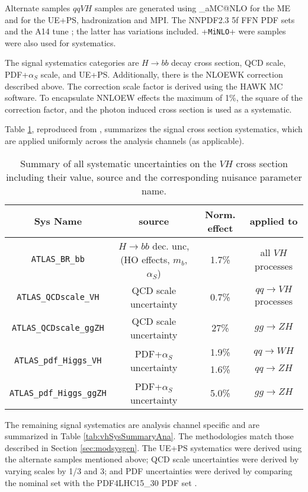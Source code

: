 Alternate samples $qqVH$ samples are generated using \mg\_aMC@NLO \cite{mg5amc} for the ME and  for the UE+PS, hadronization and MPI.  The NNPDF2.3 5f FFN PDF sets and the A14 tune \cite{a14tune}; the latter has variations included.  \powheg+\texttt{MiNLO}+ were samples were also used for systematics.

The signal systematics categories are $H\to bb$ decay cross section, QCD scale, PDF+$\alpha_S$ scale, and UE+PS.  Additionally, there is the NLOEWK correction described above.  The correction scale factor is derived using the HAWK MC software.  To encapsulate NNLOEW effects the maximum of 1\%, the square of the correction factor, and the photon induced cross section is used as a systematic. 
 
Table \ref{tab:vhSysTheorySummary}, reproduced from \cite{modelingnote}, summarizes the signal cross section systematics, which are applied uniformly across the analysis channels (as applicable).

\begin{table}[!htbp]\captionsetup{justification=centering}
\footnotesize
\centering
\begin{tabular}{ c || c | c | c  }
\hline
\hline
Sys Name  & source & Norm. effect & applied to \\
\hline
\texttt{ATLAS\_BR\_bb} 			&  $H\to bb$ dec. unc, (HO effects, $m_b$, $\alpha_S$)	&  1.7\% 	& all $VH$ processes 	\\
\hline	
\texttt{ATLAS\_QCDscale\_VH}		& QCD scale uncertainty									&  0.7\%	& $qq\to VH$ processes	\\
\hline
\texttt{ATLAS\_QCDscale\_ggZH}	& QCD scale uncertainty									&  27\%	  & $gg\to ZH$			\\
\hline
\multirow{2}{*}{\texttt{ATLAS\_pdf\_Higgs\_VH}}  & \multirow{2}{*}{PDF+$\alpha_S$ uncertainty}                  &  1.9\%    & $qq\to WH$                  \\
									  &											 &  1.6\%    &  $qq\to ZH$                  \\   
\hline
\texttt{ATLAS\_pdf\_Higgs\_ggZH}    &  PDF+$\alpha_S$ uncertainty								&    5.0\%   & $gg\to ZH$			\\
\hline
\hline
\end{tabular}
\caption{Summary of all systematic uncertainties on the $VH$ cross section including their value, source and the corresponding nuisance parameter name.}
\label{tab:vhSysTheorySummary}
\end{table}

The remaining signal systematics are analysis channel specific and are summarized in Table \ref{tab:vhSysSummaryAna}.  The methodologies match those described in Section \ref{sec:modsysgen}.  The UE+PS systematics were derived using the alternate samples mentioned above; QCD scale uncertainties were derived by varying scales by 1/3 and 3; and PDF uncertainties were derived by comparing the nominal set with the PDF4LHC15\_30 PDF set \cite{pdf4lhc}.



